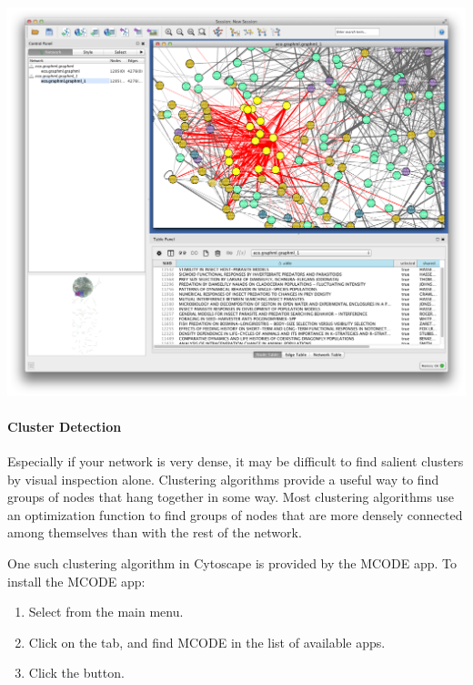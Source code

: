 \documentclass[letterpaper,10pt,english]{sphinxmanual}
\begin{document}
{\hfill\includegraphics{cyto.4.png}\hfill}


\paragraph{Cluster Detection}
\label{tutorial.bibliocoupling:clusters}\label{tutorial.bibliocoupling:cluster-detection}
Especially if your network is very dense, it may be difficult to find salient clusters
by visual inspection alone. Clustering algorithms provide a useful way to find
groups of nodes that hang together in some way. Most clustering algorithms use an
optimization function to find groups of nodes that are more densely connected among
themselves than with the rest of the network.

One such clustering algorithm in Cytoscape is provided by the MCODE app. To install
the MCODE app:
\begin{enumerate}
\item {} 
Select  from the main menu.

\item {} 
Click on the  tab, and find MCODE in the list of available apps.

\item {} 
Click the  button.

\end{enumerate}
\end{document}
